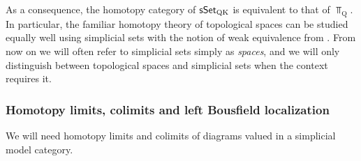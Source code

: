 \begin{remark}
  As a consequence, the homotopy category of $\operatorname{\sf sSet}_{\mathrm{QK}}$ is
  equivalent to that of $\Top_{\mathrm Q}$.  In particular, the familiar
  homotopy theory of topological spaces can be studied equally well using
  simplicial sets with the notion of weak equivalence from
  .  From now on we will often refer to
  simplicial sets simply as \emph{spaces}, and we will only distinguish
  between topological spaces and simplicial sets when the context requires it.
\end{remark}



\subsubsection{Homotopy limits, colimits and left Bousfield localization}
\label{ch2:: subsubsec: homotopy-limits-bousfield}

We will need homotopy limits and colimits of diagrams valued in a simplicial
model category.

